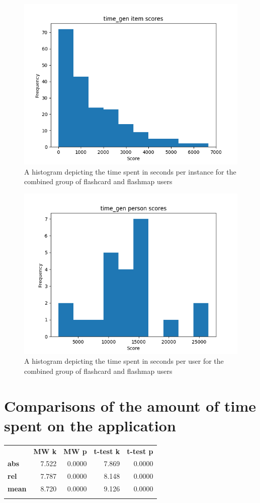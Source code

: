 \begin{figure}
    \centering
    \includegraphics[width=.7\textwidth]{img/time_gen_diff.png}
    \caption{A histogram depicting the time spent in seconds per instance for the combined group of flashcard and flashmap users} 
    \label{fig:time_gen_diff}
\end{figure}
\begin{figure}
    \centering
    \includegraphics[width=.7\textwidth]{img/time_gen_abil.png}
    \caption{A histogram depicting the time spent in seconds per user for the combined group of flashcard and flashmap users}
    \label{fig:time_gen_abil}
\end{figure}

\section{Comparisons of the amount of time spent on the application}

\begin{longtable}[c]{@{}lrrrr@{}}
\toprule\addlinespace
& \textbf{MW k} & \textbf{MW p} &
\textbf{t-test k} & \textbf{t-test p}
\\\addlinespace
\midrule
\textbf{abs} & 7.522 & 0.0000 & 7.869 & 0.0000
\\\addlinespace
\textbf{rel} & 7.787 & 0.0000 & 8.148 & 0.0000
\\\addlinespace
\textbf{mean} & 8.720 & 0.0000 & 9.126 & 0.0000
\\\addlinespace
\bottomrule
    \label{tab:time_comp}
\end{longtable}
